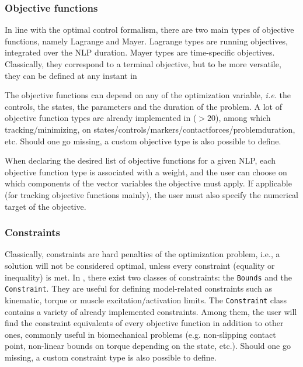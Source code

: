 \subsubsection{Objective functions}
In line with the optimal control formalism, there are two main types of objective functions, namely Lagrange and Mayer. 
Lagrange types are running objectives, integrated over the NLP duration. Mayer types are time-specific objectives. 
Classically, they correspond to a terminal objective, but to be more versatile, they can be defined at any instant in \bioptim{}

The objective functions can depend on any of the optimization variable, \textit{i.e.} the controls, the states, the parameters and the duration of the problem. 
A lot of objective function types are already implemented in \bioptim ($>\!20$), among which tracking\:/\:minimizing, on states\:/\:controls\:/\:markers\:/\:contact\:forces\:/\:problem\:duration, etc. 
Should one go missing, a custom objective type is also possible to define.

When declaring the desired list of objective functions for a given NLP, each objective function type is associated with a weight, and the user can choose on which components of the vector variables the objective must apply. 
If applicable (for tracking objective functions mainly), the user must also specify the numerical target of the objective.

\subsubsection{Constraints}
Classically, constraints are hard penalties of the optimization problem, i.e., a solution will not be considered optimal, unless every constraint (equality or inequality) is met.
In \bioptim, there exist two classes of constraints: the \texttt{Bounds} and the \texttt{Constraint}.
They are useful for defining model-related constraints such as kinematic, torque or muscle excitation\:/\:activation limits. 
The \texttt{Constraint} class contains a variety of already implemented constraints.
Among them, the user will find the constraint equivalents of every objective function in addition to  other ones, commonly useful in biomechanical problems (e.g. non-slipping contact point, non-linear bounds on torque depending on the state, etc.).
Should one go missing, a custom constraint type is also possible to define.

